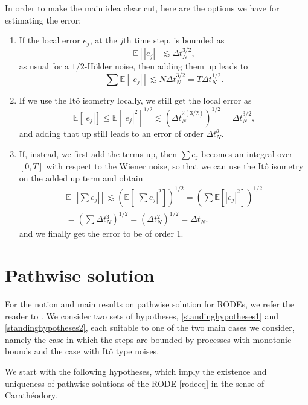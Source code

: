 \documentclass[reqno,12pt]{amsart}
\theoremstyle{plain}%
\theoremstyle{definition}
\begin{document}
In order to make the main idea clear cut, here are the options we have for estimating the error:
\begin{enumerate}
  \item If the local error $e_j$, at the $j$th time step, is bounded as
    $$
    \mathbb{E}[|e_j|] \lesssim \Delta t_N^{3/2},
    $$
    as usual for a $1/2$-H\"older noise, then adding them up leads to 
    $$
      \sum \mathbb{E}[|e_j|] \lesssim N\Delta t_N^{3/2} = T\Delta t_N^{1/2}.
    $$
    \item If we use the It\^o isometry locally, we still get the local error as
    $$
      \mathbb{E}[|e_j|] \leq \mathbb{E}[|e_j|^2]^{1/2} \lesssim \left(\Delta t_N^{2(3/2)} \right)^{1/2} = \Delta t_N^{3/2},
    $$
    and adding that up still leads to an error of order $\Delta t_N^{\theta}$.
    \item If, instead, we first add the terms up, then $\sum e_j$ becomes an integral over $[0, T]$ with respect to the Wiener noise, so that we can use the It\^o isometry on the added up term and obtain
    \begin{multline*}
      \mathbb{E}\left[ \left| \sum e_j \right| \right] \lesssim \left(\mathbb{E}\left[ \left| \sum e_j \right|^2 \right]\right)^{1/2} = \left( \sum \mathbb{E}[|e_j|^2] \right)^{1/2} \\
      = \left( \sum \Delta t_N^3 \right)^{1/2} = \left( \Delta t_N^2 \right)^{1/2} = \Delta t_N.
    \end{multline*}
    and we finally get the error to be of order 1.
\end{enumerate}

\section{Pathwise solution}
\label{secpathwisesolution}

For the notion and main results on pathwise solution for RODEs, we refer the reader to \cite[Section 2.1]{HanKloeden2017}. We consider two sets of hypotheses, \cref{standinghypotheses1} and \cref{standinghypotheses2}, each suitable to one of the two main cases we consider, namely the case in which the steps are bounded by processes with monotonic bounds and the case with It\^o type noises.

We start with the following hypotheses, which imply the existence and uniqueness of pathwise solutions of the RODE \eqref{rodeeq} in the sense of Carath\'eodory.
\end{document}
